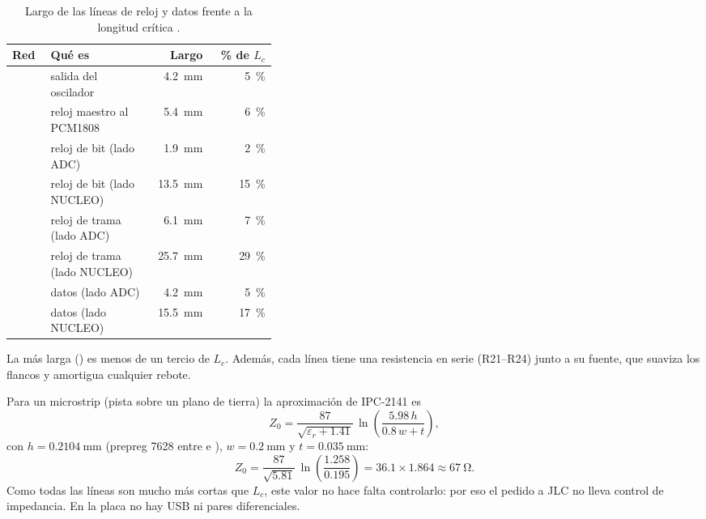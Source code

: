 \begin{table}[htbp]
\centering
\caption{Largo de las líneas de reloj y datos frente a la longitud crítica \medido.}\label{tab:c10-relojes}
\small
\begin{tabular}{@{}lL{0.38\linewidth}rr@{}}
\toprule
Red & Qué es & Largo & \% de $L_c$\\\midrule
{} & salida del oscilador & \SI{4.2}{\milli\meter} & \SI{5}{\percent}\\
 & reloj maestro al PCM1808 & \SI{5.4}{\milli\meter} & \SI{6}{\percent}\\
 & reloj de bit (lado ADC) & \SI{1.9}{\milli\meter} & \SI{2}{\percent}\\
 & reloj de bit (lado NUCLEO) & \SI{13.5}{\milli\meter} & \SI{15}{\percent}\\
 & reloj de trama (lado ADC) & \SI{6.1}{\milli\meter} & \SI{7}{\percent}\\
 & reloj de trama (lado NUCLEO) & \SI{25.7}{\milli\meter} & \SI{29}{\percent}\\
 & datos (lado ADC) & \SI{4.2}{\milli\meter} & \SI{5}{\percent}\\
 & datos (lado NUCLEO) & \SI{15.5}{\milli\meter} & \SI{17}{\percent}\\
\bottomrule
\end{tabular}
\end{table}

La más larga () es menos de un tercio de $L_c$. Además, cada línea tiene una resistencia en serie (R21--R24)
junto a su fuente, que suaviza los flancos y amortigua cualquier rebote.

\begin{calculo}
Para un microstrip (pista sobre un plano de tierra) la aproximación de IPC-2141 \copia{} es
\begin{equation}
Z_0 = \frac{87}{\sqrt{\varepsilon_r + \num{1.41}}}\,\ln\!\left(\frac{\num{5.98}\,h}{\num{0.8}\,w + t}\right),
\end{equation}
con $h = \SI{0.2104}{\milli\meter}$ (prepreg 7628 entre  e ), $w = \SI{0.2}{\milli\meter}$ y
$t = \SI{0.035}{\milli\meter}$:
\[
Z_0 = \frac{87}{\sqrt{\num{5.81}}}\,\ln\!\left(\frac{\num{1.258}}{\num{0.195}}\right) = \num{36.1}\times\num{1.864} \approx \SI{67}{\ohm}.
\]
Como todas las líneas son mucho más cortas que $L_c$, este valor no hace falta controlarlo: por eso el pedido a JLC no
lleva control de impedancia. En la placa no hay USB ni pares diferenciales.
\end{calculo}


